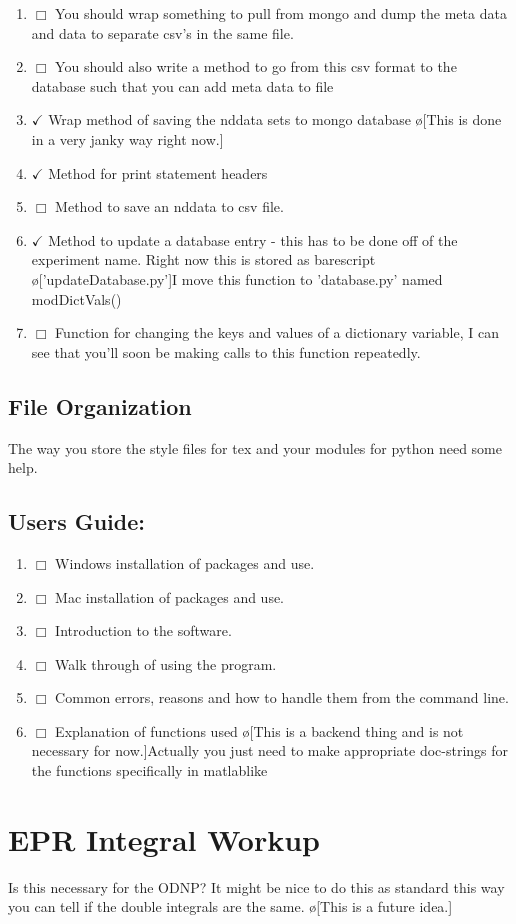 \documentclass[10pt]{book}
\begin{document}
\begin{enumerate}
    \item $\Box$ You should wrap something to pull from mongo and dump the meta data and data to separate csv's in the same file.
    \item $\Box$ You should also write a method to go from this csv format to the database such that you can add meta data to file
    \item $\checkmark$ Wrap method of saving the nddata sets to mongo database \o[This is done in a very janky way right now.]{}
    \item $\checkmark$ Method for print statement headers
    \item $\Box$ Method to save an nddata to csv file.
    \item $\checkmark$ Method to update a database entry - this has to be done off of the experiment name. Right now this is stored as barescript \o['updateDatabase.py']{I move this function to 'database.py' named modDictVals()}
    \item $\Box$ Function for changing the keys and values of a dictionary variable, I can see that you'll soon be making calls to this function repeatedly.
\end{enumerate}
\section{File Organization}
The way you store the style files for tex and your modules for python need some help.
\section{Users Guide:}
\begin{enumerate}
    \item $\Box$ Windows installation of packages and use.
    \item $\Box$ Mac installation of packages and use.
    \item $\Box$ Introduction to the software.
    \item $\Box$ Walk through of using the program.
    \item $\Box$ Common errors, reasons and how to handle them from the command line.
    \item $\Box$ Explanation of functions used \o[This is a backend thing and is not necessary for now.]{Actually you just need to make appropriate doc-strings for the functions specifically in matlablike}
\end{enumerate}
\chapter{EPR Integral Workup}
Is this necessary for the ODNP? It might be nice to do this as standard this way you can tell if the double integrals are the same. \o[This is a future idea.]
\end{document}
